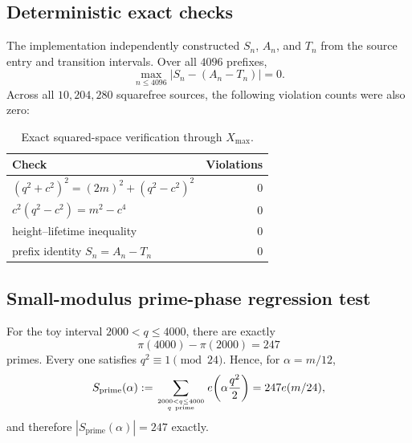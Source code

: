 \documentclass[11pt]{article}
\theoremstyle{definition}
\newcommand{\1}{\mathbf{1}}
\begin{document}
\subsection{Deterministic exact checks}

The implementation independently constructed $S_n$, $A_n$, and $T_n$ from the source entry and transition intervals.  Over all $4096$ prefixes,
\begin{equation}
 \max_{n\le4096}|S_n-(A_n-T_n)|=0.
 \label{eq:exact-AT-numerical}
\end{equation}
Across all $10{,}204{,}280$ squarefree sources, the following violation counts were also zero:

\begin{table}[htbp]
\centering
\caption{Exact squared-space verification through $X_{\max}$.}
\label{tab:exact-checks}
\small
\begin{tabular}{lr}
\toprule
Check & Violations\\
\midrule
$(q^2+c^2)^2=(2m)^2+(q^2-c^2)^2$ & 0\\
$c^2(q^2-c^2)=m^2-c^4$ & 0\\
height--lifetime inequality & 0\\
prefix identity $S_n=A_n-T_n$ & 0\\
\bottomrule
\end{tabular}
\end{table}

\subsection{Small-modulus prime-phase regression test}
\label{subsec:numerical-prime-resonance}

For the toy interval $2000<q\le4000$, there are exactly
\begin{equation}
 \pi(4000)-\pi(2000)=247
 \label{eq:toy-prime-count}
\end{equation}
primes.  Every one satisfies $q^2\equiv1\pmod{24}$.  Hence, for $\alpha=m/12$,
\begin{equation}
 S_{\mathrm{prime}}(\alpha)
 :=\sum_{2000<q\le4000\atop q\ {\rm prime}}
 e\!\left(\alpha\frac{q^2}{2}\right)
 =247e(m/24),
 \label{eq:toy-prime-resonance}
\end{equation}
and therefore $|S_{\mathrm{prime}}(\alpha)|=247$ exactly.
\end{document}
